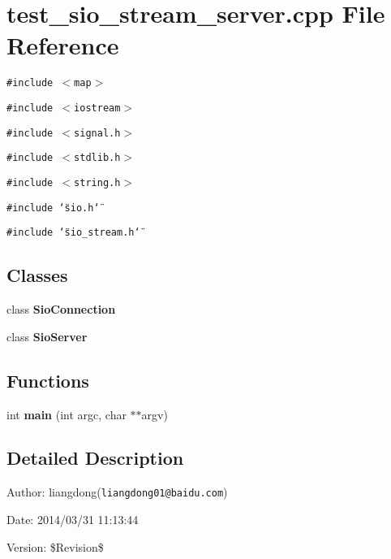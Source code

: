 \section{test\_\-sio\_\-stream\_\-server.cpp File Reference}
\label{test__sio__stream__server_8cpp}
{\tt \#include $<$map$>$}\par
{\tt \#include $<$iostream$>$}\par
{\tt \#include $<$signal.h$>$}\par
{\tt \#include $<$stdlib.h$>$}\par
{\tt \#include $<$string.h$>$}\par
{\tt \#include \char`\"{}sio.h\char`\"{}}\par
{\tt \#include \char`\"{}sio\_\-stream.h\char`\"{}}\par
\subsection*{Classes}
\begin{CompactItemize}
\item 
class {\bf Sio\-Connection}
\item 
class {\bf Sio\-Server}
\end{CompactItemize}
\subsection*{Functions}
\begin{CompactItemize}
\item 
int {\bf main} (int argc, char $\ast$$\ast$argv)\label{test__sio__stream__server_8cpp_a0}

\end{CompactItemize}


\subsection{Detailed Description}
\begin{Desc}
\item[Author:]liangdong({\tt liangdong01@baidu.com}) \end{Desc}
\begin{Desc}
\item[Date:]2014/03/31 11:13:44 \end{Desc}
\begin{Desc}
\item[Version:]\$Revision\$ \end{Desc}
